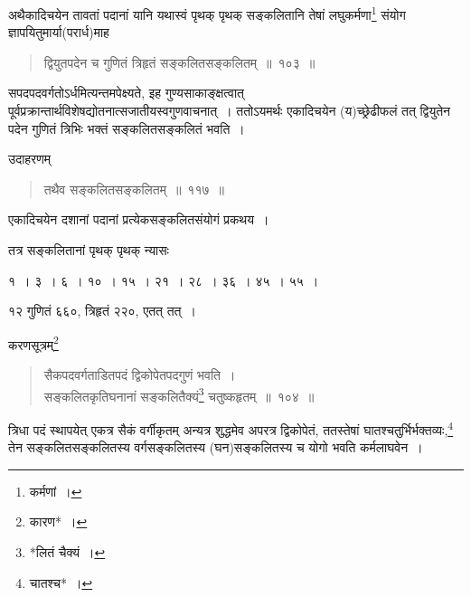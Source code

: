 \documentclass[10pt, openany]{book}
\begin{document}
{{{{{{{{{{{{{{{अथैकादिचयेन तावतां पदानां यानि यथास्वं पृथक् पृथक् सङ्कलितानि तेषां
लघुकर्मणा\renewcommand{\thefootnote}{७}\footnote{कर्मणां~।}  संयोग ज्ञापयितुमार्या(परार्ध)माह\textemdash}

\begin{quote}
    
 {\bs द्वियुतपदेन च गुणितं त्रिहृतं सङ्कलितसङ्कलितम्~॥~१०३~॥}\end{quote}

{सपदपदवर्गतोऽर्धमित्यन्तमपेक्ष्यते, इह गुण्यसाकाङ्क्षत्वात्
पूर्वप्रक्रान्तार्थविशेषद्योतनात्सजातीयस्वगुणवाचनात्~। ततोऽयमर्थः एकादिचयेन (य)च्छ्रेढीफलं तत् द्वियुतेन पदेन गुणितं}
{त्रिभिः भक्तं सङ्कलितसङ्कलितं भवति~।}
\vspace{3mm}

{उदाहरणम्\textemdash}

\begin{quote}
    
\hspace{25mm} {\eg तथैव सङ्कलितसङ्कलितम्~॥~११७~॥}\end{quote}

{एकादिचयेन दशानां पदानां प्रत्येकसङ्कलितसंयोगं प्रकथय~।}
\vspace{3mm}

{तत्र सङ्कलितानां पृथक् पृथक् न्यासः\textendash}
\vspace{-1mm}

\begin{center}

{१~। ३~। ६~। १०~। १५~। २१~। २८~। ३६~। ४५~। ५५~। }
\end{center}
\vspace{-1mm}

{१२ गुणितं ६६०, त्रिहृतं २२०, एतत् तत्~।}
\vspace{3mm}

{करणसूत्रम्\renewcommand{\thefootnote}{९}\footnote{कारण*~।}\textendash}

\begin{quote}
    
{\bs सैकपदवर्गताडितपदं द्विकोपेतपदगुणं भवति~। \\
 सङ्कलितकृतिघनानां सङ्कलितैक्यं\renewcommand{\thefootnote}{१०}\footnote{*लितं चैक्यं~।}  चतुष्कहृतम्~॥~१०४~॥}\end{quote}

{त्रिधा पदं स्थापयेत् एकत्र सैकं वर्गीकृतम् अन्यत्र शुद्धमेव अपरत्र
द्विकोपेतं, ततस्तेषां}
{घातश्चतुर्भिर्भक्तव्यः,\renewcommand{\thefootnote}{११}\footnote{चातश्च*~।}  तेन सङ्कलितसङ्कलितस्य वर्गसङ्कलितस्य
(घन)सङ्कलितस्य च योगो}
{भवति कर्मलाघवेन~।}

}}}}}}}}}}}}}}
\end{document}
